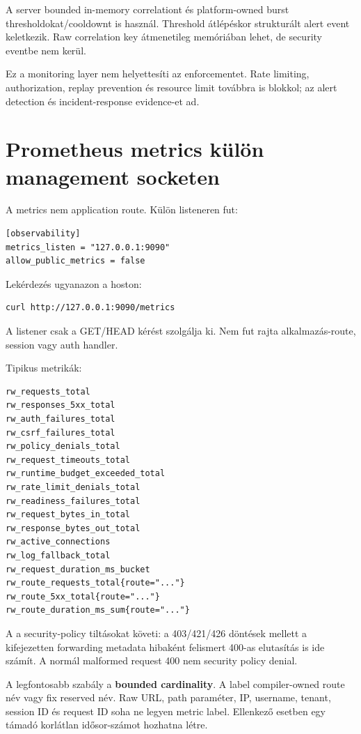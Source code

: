 A server bounded in-memory correlationt és platform-owned burst thresholdokat/cooldownt is használ. Threshold átlépéskor strukturált  alert event keletkezik. Raw correlation key átmenetileg memóriában lehet, de security eventbe nem kerül.

Ez a monitoring layer nem helyettesíti az enforcementet. Rate limiting, authorization, replay prevention és resource limit továbbra is blokkol; az alert detection és incident-response evidence-et ad.

\section{Prometheus metrics külön management socketen}

A metrics nem application route. Külön listeneren fut:

\begin{lstlisting}
[observability]
metrics_listen = "127.0.0.1:9090"
allow_public_metrics = false
\end{lstlisting}

Lekérdezés ugyanazon a hoston:

\begin{lstlisting}
curl http://127.0.0.1:9090/metrics
\end{lstlisting}

A listener csak a  GET/HEAD kérést szolgálja ki. Nem fut rajta alkalmazás-route, session vagy auth handler.

Tipikus metrikák:

\begin{lstlisting}
rw_requests_total
rw_responses_5xx_total
rw_auth_failures_total
rw_csrf_failures_total
rw_policy_denials_total
rw_request_timeouts_total
rw_runtime_budget_exceeded_total
rw_rate_limit_denials_total
rw_readiness_failures_total
rw_request_bytes_in_total
rw_response_bytes_out_total
rw_active_connections
rw_log_fallback_total
rw_request_duration_ms_bucket
rw_route_requests_total{route="..."}
rw_route_5xx_total{route="..."}
rw_route_duration_ms_sum{route="..."}
\end{lstlisting}

A  a security-policy tiltásokat követi: a 403/421/426 döntések mellett a kifejezetten forwarding metadata hibaként felismert 400-as elutasítás is ide számít. A normál malformed request 400 nem security policy denial.

A legfontosabb szabály a \textbf{bounded cardinality}. A  label compiler-owned route név vagy fix reserved név. Raw URL, path paraméter, IP, username, tenant, session ID és request ID soha ne legyen metric label. Ellenkező esetben egy támadó korlátlan idősor-számot hozhatna létre.

